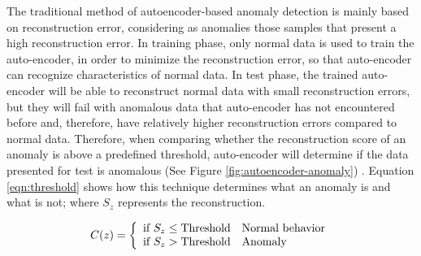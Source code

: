 The traditional method of autoencoder-based anomaly detection is mainly based on reconstruction error, considering as anomalies those samples that present a high reconstruction error. In training phase, only normal data is used to train the auto-encoder, in order to minimize the reconstruction error, so that auto-encoder can recognize  characteristics of normal data. In test phase, the trained auto-encoder will be able to reconstruct normal data with small reconstruction errors, but they will fail with anomalous data that auto-encoder has not encountered before and, therefore, have relatively higher reconstruction errors compared to normal data. Therefore, when comparing whether the reconstruction score of an anomaly is above a predefined threshold, auto-encoder will determine if the data presented for test is anomalous \cite{Reference47} (See Figure \ref{fig:autoencoder-anomaly}) . Equation \ref{eqn:threshold} shows how this technique determines what an anomaly is and what is not; where $S_{z}$ represents the reconstruction.

\begin{equation}
C(z) = \left\lbrace
\begin{array}{ll}
\textup{if } S_{z}\leq \textup{Threshold} & \textup{Normal behavior}\\
\textup{if } S_{z}> \textup{Threshold} & \textup{Anomaly}
\end{array}
\right.
\label{eqn:threshold}
\end{equation}

